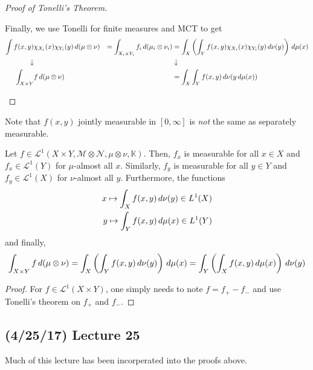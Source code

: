 \documentclass[11pt,leqno,oneside]{amsbook}
\numberwithin{thm}{section}
\renewcommand{\A}{\mathcal{A}} %
\newcommand{\M}{\mathcal{M}} %
\newcommand{\Ep}{\mathcal{E}} %
\newcommand{\cL}{\mathcal{L}}
\newcommand{\cN}{\mathcal{N}}
\newcommand{\cC}{\mathcal{C}} %
\newcommand{\K}{\mathbb{K}} %
\newcommand{\ox}{\otimes}
\begin{document}
\begin{proof}[Proof of Tonelli's Theorem]
\begin{itemize}
    Finally, we use Tonelli for finite measures and MCT to get
    \begin{align*}
      \int f(x,y) &\chi_{X_i}(x)\chi_{Y_i}(y) \d(\mu \ox \nu)
      & =\int_{X_i \times Y_i} f_i \d(\mu_i \ox \nu_i)
      &  = \int_X  \left(\int_Y f(x,y) \chi_{X_i}(x) \chi_{Y_i}(y)
        \d\nu(y)\right) \d\mu(x) \\
      \downarrow & &&  \downarrow \\
      \int_{X \times Y} & f \d(\mu \ox \nu)
       && = \int_X  \int_Y f(x,y)\d\nu(y \d\mu(x))
    \end{align*}
  \end{itemize}
\end{proof}
\begin{rmk}
  Note that \(f(x,y)\) jointly measurable in \([0,\infty]\) is
  \emph{not} the same as separately measurable. 
\end{rmk}
\begin{thm}
  Let \(f \in \cL^1(X\times Y, \M \ox \cN, \mu \ox \nu, \K)\). Then,
  \(f_x\) is measurable for all \(x \in X\)  and \(f_x \in \cL^1(Y)\)
  for \(\mu\)-almost all \(x\). Similarly, \(f_y\) is measurable for
  all \(y \in Y\) and \(f_y \in \cL^1(X)\) for \(\nu\)-almost all
  \(y\). Furthermore, the functions
  \begin{align*}
    x \mapsto \int_X f(x,y) \, d\nu(y) \in L^1(X) \\
    y \mapsto \int_Y f(x,y) \, d\mu(x) \in L^1(Y)
  \end{align*}
  and finally, \[
    \int_{X \times Y} f \d(\mu \ox \nu) = \int_X \left( \int_Y f(x,y)
      \d\nu(y) \right) \d\mu(x) = \int_Y \left( \int_X f(x,y) \d\mu(x)
    \right) \d\nu(y)
  \]
\end{thm}
\begin{proof}
  For \(f \in \cL^1(X \times Y)\), one simply needs to note \(f = f_+
  - f_-\) and use Tonelli's theorem on \(f_+\) and \(f_-\). 
\end{proof}

\subsection*{(4/25/17) Lecture 25}
Much of this lecture has been incorperated into the proofs above.
\end{document}
